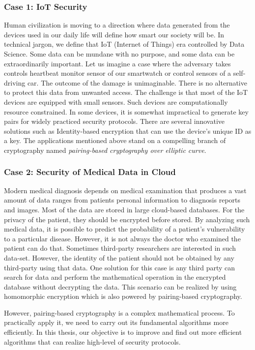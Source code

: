 \subsubsection*{Case 1: IoT Security}
Human civilization is moving to a direction where data generated from the devices used in our daily life will define how smart our society will be.
In technical jargon, we define that IoT (Internet of Things) era controlled by Data Science.
Some data can be mundane with no purpose, and some data can be extraordinarily important.
Let us imagine a case where the adversary takes controls heartbeat monitor sensor of our smartwatch or control sensors of a self-driving car.
The outcome of the damage is unimaginable. 
There is no alternative to protect this data from unwanted access.
The challenge is that most of the IoT devices are equipped with small sensors.
Such devices are computationally resource constrained.
In some devices, it is somewhat impractical to generate key pairs for widely practiced security protocols.
There are several innovative solutions such as Identity-based encryption that can use the device's unique ID as a key.
The applications mentioned above stand on a compelling branch of cryptography named \textit{pairing-based cryptography over elliptic curve}.


\subsubsection*{Case 2: Security of Medical Data in Cloud}
Modern medical diagnosis depends on medical examination that produces a vast amount of data ranges from patients personal information to diagnosis reports and images.
Most of the data are stored in large cloud-based databases. 
For the privacy of the patient, they should be encrypted before stored.
By analyzing such medical data, it is possible to predict the probability of a patient's vulnerability to a particular disease. 
However, it is not always the doctor who examined the patient can do that.
Sometimes third-party researchers are interested in such data-set. 
However, the identity of the patient should not be obtained by any third-party using that data. 
One solution for this case is any third party can search for data and perform the mathematical operation in the encrypted database without decrypting the data.
This scenario can be realized by using homomorphic encryption which is also powered by pairing-based cryptography.

However, pairing-based cryptography is a complex mathematical process.
To practically apply it, we need to carry out its fundamental algorithms more efficiently.
In this thesis, our objective is to improve and find out more efficient algorithms that can realize high-level of security protocols.

